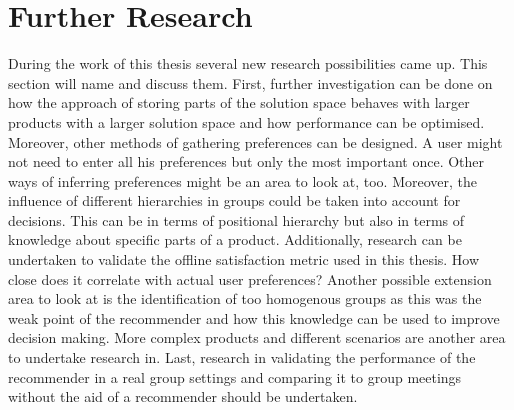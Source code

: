 \section{Further Research}
\label{sec:Conclusion:PossibleExtensions}

During the work of this thesis several new research possibilities came up. This section will name and discuss them.
First, further investigation can be done on how the approach of storing parts of the solution space behaves with larger products with a larger solution space and how performance can be optimised. Moreover, other methods of gathering preferences can be designed. A user might not need to enter all his preferences but only the most important once. Other ways of inferring preferences might be an area to look at, too. Moreover, the influence of different hierarchies in groups could be taken into account for decisions. This can be in terms of positional hierarchy but also in terms of knowledge about specific parts of a product.
Additionally, research can be undertaken to validate the offline satisfaction metric used in this thesis. How close does it correlate with actual user preferences?
Another possible extension area to look at is the identification of too homogenous groups as this was the weak point of the recommender and how this knowledge can be used to improve decision making. More complex products and different scenarios are another area to undertake research in. Last, research in validating the performance of the recommender in a real group settings and comparing it to group meetings without the aid of a recommender should be undertaken.
